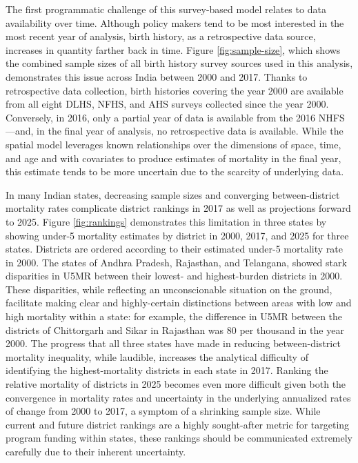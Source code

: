 \documentclass[
]{article}
\begin{document}
The first programmatic challenge of this survey-based model relates to data availability over time. Although policy makers tend to be most interested in the most recent year of analysis, birth history, as a retrospective data source, increases in quantity farther back in time. Figure \ref{fig:sample-size}, which shows the combined sample sizes of all birth history survey sources used in this analysis, demonstrates this issue across India between 2000 and 2017. Thanks to retrospective data collection, birth histories covering the year 2000 are available from all eight DLHS, NFHS, and AHS surveys collected since the year 2000. Conversely, in 2016, only a partial year of data is available from the 2016 NHFS---and, in the final year of analysis, no retrospective data is available. While the spatial model leverages known relationships over the dimensions of space, time, and age and with covariates to produce estimates of mortality in the final year, this estimate tends to be more uncertain due to the scarcity of underlying data.

In many Indian states, decreasing sample sizes and converging between-district mortality rates complicate district rankings in 2017 as well as projections forward to 2025. Figure \ref{fig:rankings} demonstrates this limitation in three states by showing under-5 mortality estimates by district in 2000, 2017, and 2025 for three states. Districts are ordered according to their estimated under-5 mortality rate in 2000. The states of Andhra Pradesh, Rajasthan, and Telangana, showed stark disparities in U5MR between their lowest- and highest-burden districts in 2000. These disparities, while reflecting an unconscionable situation on the ground, facilitate making clear and highly-certain distinctions between areas with low and high mortality within a state: for example, the difference in U5MR between the districts of Chittorgarh and Sikar in Rajasthan was 80 per thousand in the year 2000. The progress that all three states have made in reducing between-district mortality inequality, while laudible, increases the analytical difficulty of identifying the highest-mortality districts in each state in 2017. Ranking the relative mortality of districts in 2025 becomes even more difficult given both the convergence in mortality rates and uncertainty in the underlying annualized rates of change from 2000 to 2017, a symptom of a shrinking sample size. While current and future district rankings are a highly sought-after metric for targeting program funding within states, these rankings should be communicated extremely carefully due to their inherent uncertainty.
\end{document}
